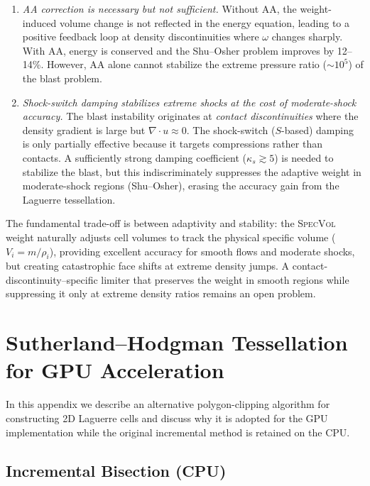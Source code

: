 \documentclass[twocolumn]{aastex63}
\newcommand{\vel}{{u}}
\begin{document}
\begin{enumerate}
  \item \textit{AA correction is necessary but not sufficient.}
    Without AA, the weight-induced volume change is not
    reflected in the energy equation, leading to a positive
    feedback loop at density discontinuities where $\omega$
    changes sharply.  With AA, energy is conserved
    and the Shu--Osher problem improves by 12--14\%.
    However, AA alone cannot stabilize the extreme pressure
    ratio ($\sim10^5$) of the blast problem.

  \item \textit{Shock-switch damping stabilizes extreme shocks
    at the cost of moderate-shock accuracy.}
    The blast instability originates at \textit{contact
    discontinuities} where the density gradient is large
    but $\nabla\cdot\vel \approx 0$.  The shock-switch
    ($S$-based) damping is only partially effective because
    it targets compressions rather than contacts.  A
    sufficiently strong damping coefficient ($\kappa_s \gtrsim 5$)
    is needed to stabilize the blast, but this
    indiscriminately suppresses the adaptive weight
    in moderate-shock regions (Shu--Osher), erasing the
    accuracy gain from the Laguerre tessellation.

\end{enumerate}

The fundamental trade-off is between adaptivity and stability:
the \textsc{SpecVol} weight naturally adjusts cell volumes
to track the physical specific volume ($V_i = m/\rho_i$),
providing excellent accuracy for smooth flows and moderate
shocks, but creating catastrophic face shifts at extreme
density jumps.  A contact-discontinuity--specific limiter
that preserves the weight in smooth regions while suppressing
it only at extreme density ratios remains an open problem.


\section{Sutherland--Hodgman Tessellation for GPU Acceleration}
\label{app:shtess}

In this appendix we describe an alternative polygon-clipping algorithm
for constructing 2D Laguerre cells and discuss why it is adopted for
the GPU implementation while the original incremental method is
retained on the CPU.

\subsection{Incremental Bisection (CPU)}
\end{document}

